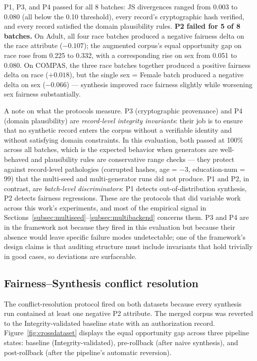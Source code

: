 \documentclass[11pt]{article}
\begin{document}
P1, P3, and P4 passed for all 8 batches: JS divergences ranged from 0.003 to 0.080 (all below the 0.10 threshold), every record's cryptographic hash verified, and every record satisfied the domain plausibility rules. \textbf{P2 failed for 5 of 8 batches.} On Adult, all four race batches produced a negative fairness delta on the race attribute ($-0.107$); the augmented corpus's equal opportunity gap on race rose from 0.225 to 0.332, with a corresponding rise on sex from 0.051 to 0.080. On COMPAS, the three race batches together produced a positive fairness delta on race ($+0.018$), but the single sex = Female batch produced a negative delta on sex ($-0.066$) --- synthesis improved race fairness slightly while worsening sex fairness substantially.

A note on what the protocols measure. P3 (cryptographic provenance) and P4 (domain plausibility) are \emph{record-level integrity invariants}: their job is to ensure that no synthetic record enters the corpus without a verifiable identity and without satisfying domain constraints. In this evaluation, both passed at 100\% across all batches, which is the expected behavior when generators are well-behaved and plausibility rules are conservative range checks --- they protect against record-level pathologies (corrupted hashes, age = $-3$, education-num = 99) that the multi-seed and multi-generator runs did not produce. P1 and P2, in contrast, are \emph{batch-level discriminators}: P1 detects out-of-distribution synthesis, P2 detects fairness regressions. These are the protocols that did variable work across this work's experiments, and most of the empirical signal in Sections~\ref{subsec:multiseed}--\ref{subsec:multibackend} concerns them. P3 and P4 are in the framework not because they fired in this evaluation but because their absence would leave specific failure modes undetectable; one of the framework's design claims is that auditing structure must include invariants that hold trivially in good cases, so deviations are surfaceable.

\subsection{Fairness--Synthesis conflict resolution}

The conflict-resolution protocol fired on both datasets because every synthesis run contained at least one negative P2 attribute. The merged corpus was reverted to the Integrity-validated baseline state with an authorization record. Figure~\ref{fig:crossdataset} displays the equal opportunity gap across three pipeline states: baseline (Integrity-validated), pre-rollback (after naive synthesis), and post-rollback (after the pipeline's automatic reversion).
\end{document}
